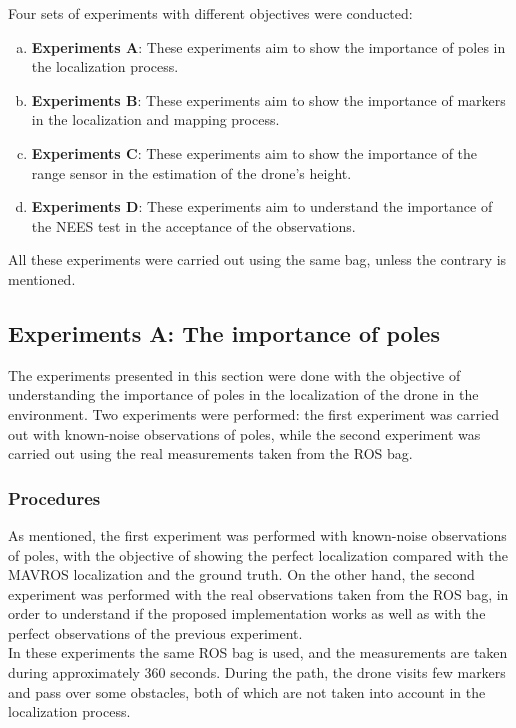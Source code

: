 Four sets of experiments with different objectives were conducted:
\begin{enumerate}[a)]
    \item{\textbf{Experiments A}: These experiments aim to show the importance of poles in the localization process.}
    \item{\textbf{Experiments B}: These experiments aim to show the importance of markers in the localization and mapping process.}
    \item{\textbf{Experiments C}: These experiments aim to show the importance of the range sensor in the estimation of the drone's height.}
    \item{\textbf{Experiments D}: These experiments aim to understand the importance of the \ac{NEES} test in the acceptance of the observations.}
\end{enumerate}
All these experiments were carried out using the same bag, unless the contrary is mentioned.

\subsection{Experiments A: The importance of poles}
\label{subsec:chapter3:simulation:a}
The experiments presented in this section were done with the objective of understanding the importance of poles in the localization of the drone in the environment. Two experiments were performed: the first experiment was carried out with known-noise observations of poles, while the second experiment was carried out using the real measurements taken from the \ac{ROS} bag.

\subsubsection{Procedures}
\label{subsubsec:chapter3:simulation:a:procedures}
As mentioned, the first experiment was performed with known-noise observations of poles, with the objective of showing the perfect localization compared with the MAVROS localization and the ground truth. On the other hand, the second experiment was performed with the real observations taken from the \ac{ROS} bag, in order to understand if the proposed implementation works as well as with the perfect observations of the previous experiment.\\

In these experiments the same \ac{ROS} bag is used, and the measurements are taken during approximately 360 seconds. During the path, the drone visits few markers and pass over some obstacles, both of which are not taken into account in the localization process.

